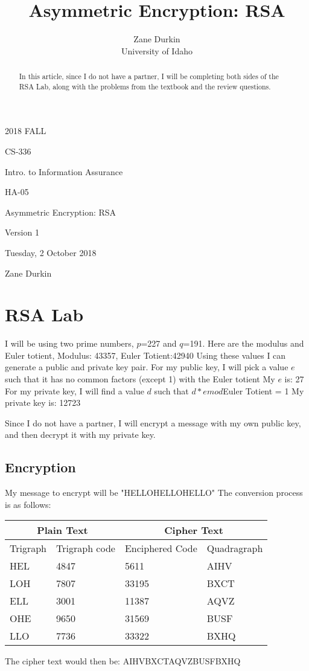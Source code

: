 \documentclass[14pt]{article}
\begin{document}
\title{Asymmetric Encryption: RSA}

\author{Zane Durkin\\
    University of Idaho}
\begin{description}[leftmargin=!, labelwidth=\widthof{\bfseries Author(s) Name(s)}]
\item [Year and Semester] 2018 FALL
\item [Course Number] CS-336
\item [Course Title] Intro. to Information Assurance
\item [Work Number] HA-05
\item [Work Name] Asymmetric Encryption: RSA
\item [Work Version] Version 1
\item [Long Date] Tuesday, 2 October 2018
\item [Author(s) Name(s)] Zane Durkin
\end{description}
\begin{abstract}
In this article, since I do not have a partner, I will be completing both sides of the RSA Lab, along with the problems from the textbook and the review questions.
\end{abstract}

\section{RSA Lab}
I will be using two prime numbers, $p$=227 and $q$=191.
Here are the modulus and Euler totient, Modulus: 43357, Euler Totient:42940
Using these values I can generate a public and private key pair.
For my public key, I will pick a value $e$ such that it has no common factors (except 1) with the Euler totient
My $e$ is: 27
For my private key, I will find a value $d$ such that $d*e mod $Euler Totient = 1
My private key is: 12723

Since I do not have a partner, I will encrypt a message with my own public key, and then decrypt it with my private key.
\subsection{Encryption}
My message to encrypt will be "HELLOHELLOHELLO"
The conversion process is as follows:

\begin{center}
    \begin{tabular}{| l | l | l | l |}
      \hline
      \multicolumn{2}{|c|}{Plain Text} &
      \multicolumn{2}{|c|}{Cipher Text} \\
      \hline
      Trigraph &
      Trigraph code &
      Enciphered Code &
	  Quadragraph \\
      \hline
      HEL & 4847 & 5611 & AIHV\\
	  LOH & 7807 & 33195 & BXCT\\
      ELL & 3001 & 11387 & AQVZ\\
      OHE & 9650 & 31569 & BUSF\\
      LLO & 7736 & 33322 & BXHQ\\
      \hline 
    \end{tabular}
\end{center}
The cipher text would then be:
AIHVBXCTAQVZBUSFBXHQ
\end{document}
